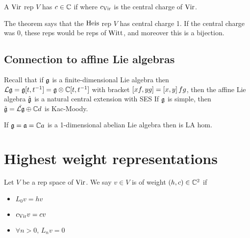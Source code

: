 \documentclass{article}
\begin{document}
\begin{definition}
A $\Vir$ rep $V$ has  $c \in \mbb{C}$ if 
where $c_{\Vir}$ is the central charge of $\Vir$. 
\end{definition}

\begin{remark}
The theorem says that the $\Heis$ rep $V$ has central charge 1. If the central charge was 0, these reps would be reps of $\Witt$, and moreover this is a bijection.
\end{remark}

\subsection{Connection to affine Lie algebras}

Recall that if $\mf{g}$ is a finite-dimensional Lie algebra then $\mc{L}\mf{g} = \mf{g}[t,t^{-1}] = \mf{g} \otimes \mbb{C}[t,t^{-1}]$ with bracket $\comm[xf]{yg} = \comm[x]{y} fg$, then the affine Lie algebra $\hat{\mf{g}}$ is a natural central extension with SES 
If $\mf{g}$ is simple, then $\hat{\mf{g}} = \tilde{\mc{L}\mf{g}} \oplus \mbb{C}d$ is Kac-Moody. 

\begin{example}
If $\mf{g} =\mf{a} =  \mbb{C}a$ is a 1-dimensional abelian Lie algebra then 
is LA hom. 
\end{example}


\section{Highest weight representations}

\begin{definition}
Let $V$ be a rep space of $\Vir$. We say $v \in V$ is  of weight $(h,c) \in \mbb{C}^2$ if 
\begin{itemize}
    \item $L_0 v = hv$
    \item $c_{\Vir} v = cv$
    \item $\forall n >0, \, L_n v = 0$
\end{itemize}
\end{definition}
\end{document}

